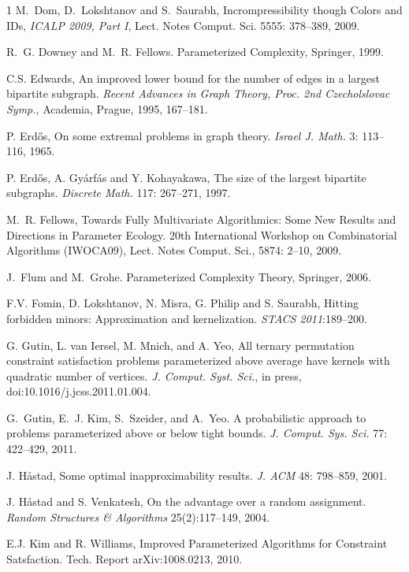 \documentclass{llncs}
\begin{document}
\begin{thebibliography}{1}
 M.~Dom, D.~Lokshtanov and S.~Saurabh, Incrompressibility though Colors and IDs, {\em ICALP 2009, Part I},
Lect. Notes Comput. Sci. 5555: 378--389, 2009.

R.~G. Downey and M.~R. Fellows.
Parameterized Complexity,
Springer, 1999.

 C.S. Edwards, An improved lower bound for the number of edges in a largest bipartite subgraph.
{\em Recent Advances in Graph Theory, Proc. 2nd Czecholslovac Symp.}, Academia, Prague, 1995, 167--181.

  P. Erd{\H o}s, On some extremal problems in graph theory. {\em Israel J. Math.} 3: 113--116, 1965.

 P. Erd{\H o}s, A. Gy{\'a}rf{\'a}s and Y. Kohayakawa,
The size of the largest bipartite subgraphs. {\em Discrete Math.} 117: 267--271, 1997.

 M.~R. Fellows, Towards Fully Multivariate Algorithmics: Some New Results and
Directions in Parameter Ecology. 20th International Workshop on Combinatorial Algorithms (IWOCA09),
Lect. Notes Comput. Sci., 5874: 2--10, 2009.

J.~Flum and M.~Grohe.
Parameterized Complexity Theory,
Springer, 2006.

 F.V. Fomin, D. Lokshtanov, N. Misra, G. Philip and S. Saurabh, Hitting forbidden minors:
Approximation and kernelization. {\em STACS 2011}:189--200.


 G. Gutin, L. van Iersel, M. Mnich, and A. Yeo, All ternary permutation constraint satisfaction
problems parameterized above average have kernels with quadratic number of vertices. {\em J. Comput. Syst. Sci.}, in press,
doi:10.1016/j.jcss.2011.01.004.

G.~Gutin, E.~J. Kim, S.~Szeider, and A.~Yeo.
A probabilistic approach to problems parameterized above or below
tight bounds.  {\em J. Comput. Sys. Sci.} 77: 422--429,  2011.


 J. H\aa stad, Some optimal inapproximability results. {\em J. ACM} 48: 798--859, 2001.

J. H\aa stad and S. Venkatesh, On the advantage over a random
assignment. {\em Random Structures \& Algorithms} 25(2):117--149, 2004.



 E.J. Kim and R. Williams,
Improved Parameterized Algorithms for Constraint Satsfaction. Tech. Report arXiv:1008.0213, 2010.


\end{thebibliography}
\end{document}
